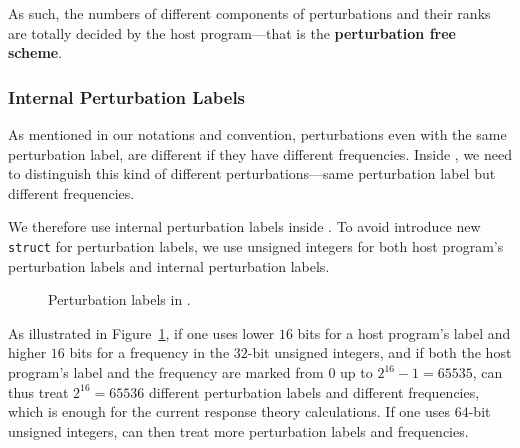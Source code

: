 As such, the numbers of different components of perturbations and their ranks
are totally decided by the host program---that is the
\textbf{perturbation free scheme}.

\subsubsection{Internal Perturbation Labels}

As mentioned in our notations and convention, perturbations even with the same
perturbation label, are different if they have different frequencies. Inside
\LibName, we need to distinguish this kind of different perturbations---same
perturbation label but different frequencies.

We therefore use internal perturbation labels inside \LibName. To avoid
introduce new \texttt{struct} for perturbation labels, we use unsigned integers
for both host program's perturbation labels and \LibName internal perturbation
labels.

\begin{figure}[hbt]
  \centering
  \scalebox{0.9}{}
  \caption{Perturbation labels in \LibName.}
  \label{fig-perturbation-label}
\end{figure}

As illustrated in Figure~\ref{fig-perturbation-label}, if one uses lower $16$
bits for a host program's label and higher $16$ bits for a frequency in the
$32$-bit unsigned integers, and if both the host program's label and the
frequency are marked from $0$ up to $2^{16}-1=65535$, \LibName can thus treat
$2^{16}=65536$ different perturbation labels and different frequencies, which
is enough for the current response theory calculations. If one uses $64$-bit
unsigned integers, \LibName can then treat more perturbation labels and
frequencies.

